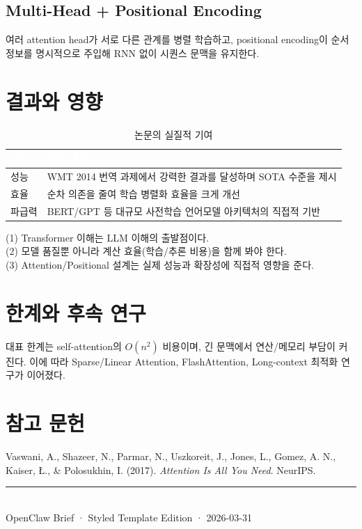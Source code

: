 \documentclass[11pt,a4paper]{article}
\newenvironment{keybox}[2]{%
  \begin{tcolorbox}[colback=#1, colframe=dgistblue!60,
    title={\small\bfseries\color{white}#2},
    coltitle=white, colbacktitle=dgistblue,
    left=6pt, right=6pt, top=4pt, bottom=4pt,
    boxrule=0.6pt]
}{\end{tcolorbox}}
\begin{document}
\subsection{Multi-Head + Positional Encoding}
여러 attention head가 서로 다른 관계를 병렬 학습하고,
positional encoding이 순서 정보를 명시적으로 주입해 RNN 없이 시퀀스 문맥을 유지한다.

\section{결과와 영향}
\begin{table}[H]
\centering\small
\begin{tabularx}{\linewidth}{|l|X|}
\hline
\rowcolor{tabhead}\textcolor{white}{\textbf{항목}} & \textcolor{white}{\textbf{핵심 내용}} \\
\hline
성능 & WMT 2014 번역 과제에서 강력한 결과를 달성하며 SOTA 수준을 제시 \\
\hline
효율 & 순차 의존을 줄여 학습 병렬화 효율을 크게 개선 \\
\hline
파급력 & BERT/GPT 등 대규모 사전학습 언어모델 아키텍처의 직접적 기반 \\
\hline
\end{tabularx}
\caption{논문의 실질적 기여}
\end{table}

\begin{keybox}{bgpurple}{실무 관점 Takeaway}
(1) Transformer 이해는 LLM 이해의 출발점이다.\\
(2) 모델 품질뿐 아니라 계산 효율(학습/추론 비용)을 함께 봐야 한다.\\
(3) Attention/Positional 설계는 실제 성능과 확장성에 직접적 영향을 준다.
\end{keybox}

\clearpage
\section{한계와 후속 연구}
대표 한계는 self-attention의 $O(n^2)$ 비용이며, 긴 문맥에서 연산/메모리 부담이 커진다.
이에 따라 Sparse/Linear Attention, FlashAttention, Long-context 최적화 연구가 이어졌다.

\section{참고 문헌}
Vaswani, A., Shazeer, N., Parmar, N., Uszkoreit, J., Jones, L., Gomez, A. N., Kaiser, \L{}., \& Polosukhin, I. (2017).
\textit{Attention Is All You Need}. NeurIPS.

\vfill
\begin{center}
\small\color{gray}\rule{0.5\linewidth}{0.4pt}\\[4pt]
OpenClaw Brief · Styled Template Edition · 2026-03-31
\end{center}
\end{document}
